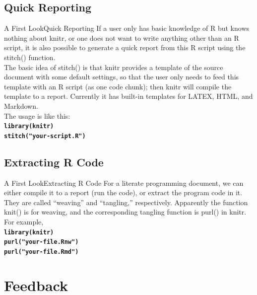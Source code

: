 \documentclass[10pt]{beamer}
\begin{document}
\subsection{Quick Reporting}
\begin{frame}{A First Look}{Quick Reporting}
	If a user only has basic knowledge of R but knows nothing about knitr, 	or one does not want to write anything other than an R script, it is also 	possible to generate a quick report from this R script using the stitch() function.\\
	\vspace{0.5cm}
	The basic idea of stitch() is that knitr provides a template of the 	source document with some default settings, so that the user only needs to feed this template with an R script (as one code chunk); then knitr will compile the template to a report. Currently it has built-in templates for LATEX, HTML, and Markdown.\\
	\vspace{0.5cm}
	The usage is like this:\\
	{\tt \textbf{library(knitr)}}\\
	{\tt \textbf{stitch("your-script.R")}}\\
	
\end{frame}

\subsection{Extracting R Code}
\begin{frame}{A First Look}{Extracting R Code}
	For a literate programming document, we can either compile it to a report (run the code), or extract the program code in it. They are called “weaving” and “tangling,” respectively. Apparently the function knit() is for weaving, and the corresponding tangling function is purl() in knitr. For example,\\
	\vspace{0.5cm}
	{\tt \textbf{library(knitr)}}\\
	{\tt \textbf{purl("your-file.Rnw")}}\\
	{\tt \textbf{purl("your-file.Rmd")}}\\
		
\end{frame}


\section{Feedback}
\end{document}
